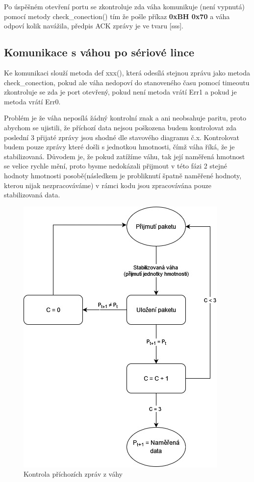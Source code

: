
Po úspěšném otevření portu se zkontroluje zda váha komunikuje (není vypnutá) pomocí metody check\_conection() tím že pošle příkaz \textbf{0xBH 0x70} a váha odpoví kolik navážila, předpis ACK zprávy je ve tvaru [sss].


\subsection{Komunikace s váhou po sériové lince}

Ke komunikaci slouží metoda def xxx(), která odesílá stejnou zprávu jako metoda check\_conection, pokud ale váha nedopoví do stanoveného času pomocí timeoutu zkontroluje se zda je port otevřený, pokud není metoda vrátí Err1 a pokud je metoda vrátí Err0.

Problém je že váha neposílá žádný kontrolní znak a ani neobsahuje paritu, proto abychom se ujistili, že příchozí data nejsou poškozena budem kontrolovat zda poslední 3 přijaté zprávy jsou shodné dle stavového diagramu č.x. Kontrolovat budem pouze zprávy které došli s jednotkou hmotnosti, čímž váha říká, že je stabilizovaná. Důvodem je, že pokud zatížíme váhu, tak její naměřená hmotnost se velice rychle mění, proto bysme nedokázali přijmout v této fázi 2 stejné hodnoty hmotnosti posobě(následkem je probliknutí špatně naměřené hodnoty, kterou nijak nezpracováváme) v rámci kodu jsou zpracovávána pouze stabilizovaná data.


\begin{figure}[H]
    \begin{center}
        \includegraphics[scale=0.6]{obrazky/stavovy_automat_parita.jpg}
    \end{center}
    \caption{Kontrola příchozích zpráv z váhy}
    \label{ošetření parity}
\end{figure}


